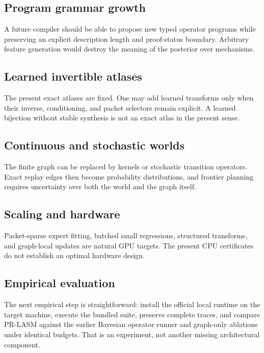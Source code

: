 \documentclass[11pt]{article}
\theoremstyle{remark}
\begin{document}
\subsection{Program grammar growth}

A future compiler should be able to propose new typed operator programs while preserving an explicit description length and proof-status boundary.  Arbitrary feature generation would destroy the meaning of the posterior over mechanisms.

\subsection{Learned invertible atlases}

The present exact atlases are fixed.  One may add learned transforms only when their inverse, conditioning, and packet selectors remain explicit.  A learned bijection without stable synthesis is not an exact atlas in the present sense.

\subsection{Continuous and stochastic worlds}

The finite graph can be replaced by kernels or stochastic transition operators.  Exact replay edges then become probability distributions, and frontier planning requires uncertainty over both the world and the graph itself.

\subsection{Scaling and hardware}

Packet-sparse expert fitting, batched small regressions, structured transforms, and graph-local updates are natural GPU targets.  The present CPU certificates do not establish an optimal hardware design.

\subsection{Empirical evaluation}

The next empirical step is straightforward: install the official local runtime on the target machine, execute the bundled suite, preserve complete traces, and compare PR-LASM against the earlier Bayesian operator runner and graph-only ablations under identical budgets.  That is an experiment, not another missing architectural component.
\end{document}
